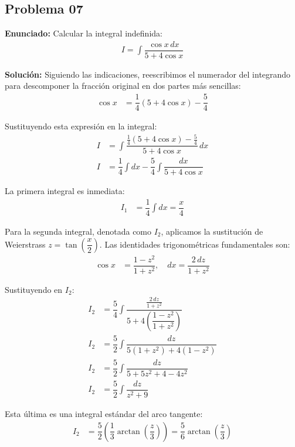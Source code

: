 \subsection*{Problema 07}

\textbf{Enunciado:}
Calcular la integral indefinida:
\begin{align*}
I = \int \dfrac{\cos x \, dx}{5 + 4\cos x}
\end{align*}

\textbf{Solución:}
Siguiendo las indicaciones, reescribimos el numerador del integrando para descomponer la fracción original en dos partes más sencillas:
\begin{align*}
\cos x &= \dfrac{1}{4} \left( 5 + 4\cos x \right) - \dfrac{5}{4}
\end{align*}

Sustituyendo esta expresión en la integral:
\begin{align*}
I &= \int \dfrac{\frac{1}{4}(5 + 4\cos x) - \frac{5}{4}}{5 + 4\cos x} \, dx \\
I &= \dfrac{1}{4} \int dx - \dfrac{5}{4} \int \dfrac{dx}{5 + 4\cos x}
\end{align*}

La primera integral es inmediata:
\begin{align*}
I_1 &= \dfrac{1}{4} \int dx = \dfrac{x}{4}
\end{align*}

Para la segunda integral, denotada como $I_2$, aplicamos la sustitución de Weierstrass $z = \tan\left(\dfrac{x}{2}\right)$. Las identidades trigonométricas fundamentales son:
\begin{align*}
\cos x &= \dfrac{1 - z^2}{1 + z^2}, \quad dx = \dfrac{2 \, dz}{1 + z^2}
\end{align*}

Sustituyendo en $I_2$:
\begin{align*}
I_2 &= \dfrac{5}{4} \int \dfrac{\frac{2 \, dz}{1 + z^2}}{5 + 4\left(\dfrac{1 - z^2}{1 + z^2}\right)} \\
I_2 &= \dfrac{5}{2} \int \dfrac{dz}{5(1 + z^2) + 4(1 - z^2)} \\
I_2 &= \dfrac{5}{2} \int \dfrac{dz}{5 + 5z^2 + 4 - 4z^2} \\
I_2 &= \dfrac{5}{2} \int \dfrac{dz}{z^2 + 9}
\end{align*}

Esta última es una integral estándar del arco tangente:
\begin{align*}
I_2 &= \dfrac{5}{2} \left( \dfrac{1}{3} \arctan\left(\dfrac{z}{3}\right) \right) = \dfrac{5}{6} \arctan\left(\dfrac{z}{3}\right)
\end{align*}

